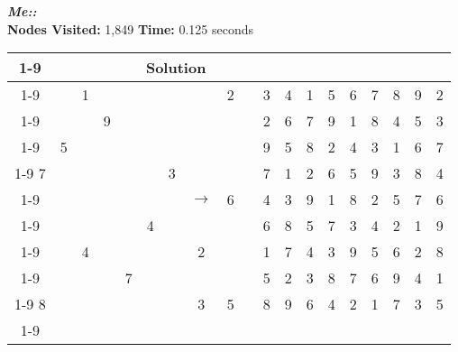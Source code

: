\documentclass{article}
\begin{document}
\newpage
\small\emph{\textbf{Me::}}\\ \textbf{Nodes Visited:} 1,849 \textbf{Time:} 0.125 seconds\\
\begin{tabular}{||c|c|c||c|c|c||c|c|c|| c ||c|c|c||c|c|c||c|c|c||}
  \cmidrule{1-9} \cmidrule{11-19}
  \multicolumn{9}{|c|}{Problem} &                   & \multicolumn{9}{|c|}{Solution}   \\\cmidrule{1-9} \cmidrule{11-19} \morecmidrules \cmidrule{1-9} \cmidrule{11-19}
  &   & 1 &   &   &   &   &   & 2 &  & 3 & 4 & 1 & 5 & 6 & 7 & 8 & 9 & 2\\\cmidrule{1-9} \cmidrule{11-19}
  &   &   & 9 &   &   &   &   &   &  & 2 & 6 & 7 & 9 & 1 & 8 & 4 & 5 & 3\\\cmidrule{1-9} \cmidrule{11-19}
  & 5 &   &   &   &   &   &   &   &  & 9 & 5 & 8 & 2 & 4 & 3 & 1 & 6 & 7\\\cmidrule{1-9} \cmidrule{11-19} \morecmidrules \cmidrule{1-9} \cmidrule{11-19}
7 &   &   &   &   &   & 3 &   &   &  & 7 & 1 & 2 & 6 & 5 & 9 & 3 & 8 & 4\\\cmidrule{1-9} \cmidrule{11-19}
  &   &   &   &   &   &   & $\rightarrow$  & 6 &  & 4 & 3 & 9 & 1 & 8 & 2 & 5 & 7 & 6\\\cmidrule{1-9} \cmidrule{11-19}
  &   &   &   &   & 4 &   &   &   &  & 6 & 8 & 5 & 7 & 3 & 4 & 2 & 1 & 9\\\cmidrule{1-9} \cmidrule{11-19} \morecmidrules \cmidrule{1-9} \cmidrule{11-19}
  &   & 4 &   &   &   &   & 2 &   &  & 1 & 7 & 4 & 3 & 9 & 5 & 6 & 2 & 8\\\cmidrule{1-9} \cmidrule{11-19}
  &   &   &   & 7 &   &   &   &   &  & 5 & 2 & 3 & 8 & 7 & 6 & 9 & 4 & 1\\\cmidrule{1-9} \cmidrule{11-19}
8 &   &   &   &   &   &   & 3 & 5 &  & 8 & 9 & 6 & 4 & 2 & 1 & 7 & 3 & 5\\\cmidrule{1-9} \cmidrule{11-19} \morecmidrules \cmidrule{1-9} \cmidrule{11-19}

 \end{tabular}
\\
\end{document}
